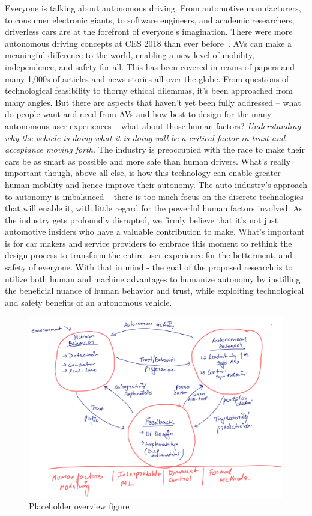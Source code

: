 Everyone is talking about autonomous driving. 
From automotive manufacturers, to consumer electronic giants, to software engineers, and academic researchers, driverless cars are at the forefront of everyone’s imagination. 
There were more autonomous driving concepts at CES 2018 than ever before~\cite{techcrunch_2018}. 
AVs can make a meaningful difference to the world, enabling a new level of mobility, independence, and safety for all. 
This has been covered in reams of papers and many 1,000s of articles and news stories all over the globe. 
From questions of technological feasibility to thorny ethical dilemmas, it’s been approached from many angles.
But there are aspects that haven’t yet been fully addressed – what do people want and need from AVs and how best to design for the many autonomous user experiences – what about those human factors?
\textit{Understanding why the vehicle is doing what it is doing will be a critical factor in trust and acceptance moving forth.}
The industry is preoccupied with the race to make their cars be as smart as possible and more safe than human drivers.
What’s really important though, above all else, is how this technology can enable greater human mobility and hence improve their autonomy. 
The auto industry's approach to autonomy is imbalanced – there is too much focus on the discrete technologies that will enable it, with little regard for the powerful human factors involved. 
As the industry gets profoundly disrupted, we firmly believe that it’s not just automotive insiders who have a valuable contribution to make. 
What's important is for car makers and service providers to embrace this moment to rethink the design process to transform the entire user experience for the betterment, and safety of everyone. 
With that in mind - the goal of the proposed research is to utilize both human and machine advantages to humanize autonomy by instilling the beneficial nuance of human behavior and trust, while exploiting technological and safety benefits of an autonomous vehicle.

\begin{figure}
    \centering
    \includegraphics[width=0.6\columnwidth]{figures/overview.png}
    \caption{Placeholder overview figure}
    \label{fig:overview}
\end{figure}

